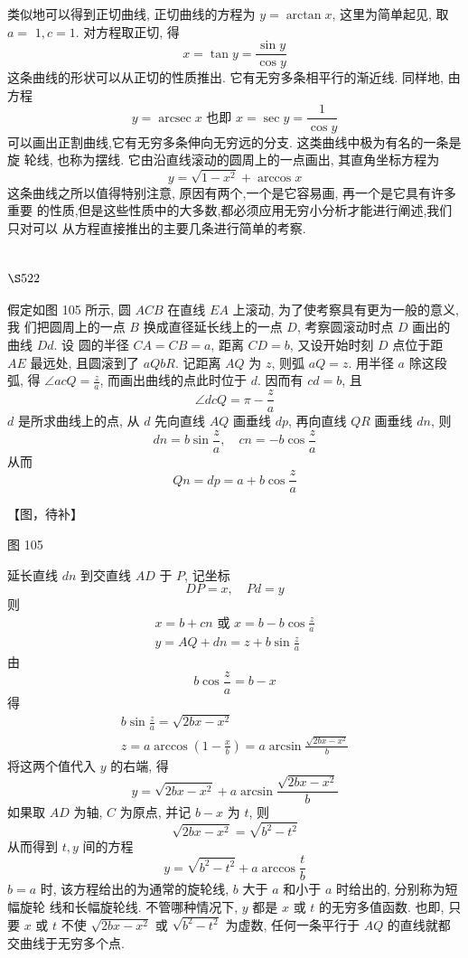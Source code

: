 类似地可以得到正切曲线, 正切曲线的方程为 $y=\arctan x$, 这里为简单起见, 取 $a=$ $1, c=1$. 对方程取正切, 得
\[
x=\tan y=\frac{\sin y}{\cos y}
\]
这条曲线的形状可以从正切的性质推出. 它有无穷多条相平行的渐近线. 同样地, 由方程
\[
y=\operatorname{arcsec} x \text { 也即 } x=\sec y=\frac{1}{\cos y}
\]
可以画出正割曲线,它有无穷多条伸向无穷远的分支. 这类曲线中极为有名的一条是旋 轮线, 也称为摆线. 它由沿直线滚动的圆周上的一点画出, 其直角坐标方程为
\[
y=\sqrt{1-x^{2}}+\arccos x
\]
这条曲线之所以值得特别注意, 原因有两个,一个是它容易画, 再一个是它具有许多重要 的性质,但是这些性质中的大多数,都必须应用无穷小分析才能进行阐述,我们只对可以 从方程直接推出的主要几条进行简单的考察.

\section{$\S 522$}

假定如图 105 所示, 圆 $A C B$ 在直线 $E A$ 上滚动, 为了使考察具有更为一般的意义, 我 们把圆周上的一点 $B$ 换成直径延长线上的一点 $D$, 考察圆滚动时点 $D$ 画出的曲线 $D d$. 设 圆的半径 $C A=C B=a$, 距离 $C D=b$, 又设开始时刻 $D$ 点位于距 $A E$ 最远处, 且圆滚到了 $a Q b R$. 记距离 $A Q$ 为 $z$, 则弧 $a Q=z$. 用半径 $a$ 除这段弧, 得 $\angle a c Q=\frac{z}{a}$, 而画出曲线的点此时位于 $d$. 因而有 $c d=b$, 且
\[
\angle d c Q=\pi-\frac{z}{a}
\]
$d$ 是所求曲线上的点, 从 $d$ 先向直线 $A Q$ 画垂线 $d p$, 再向直线 $Q R$ 画垂线 $d n$, 则
\[
d n=b \sin \frac{z}{a}, \quad c n=-b \cos \frac{z}{a}
\]
从而
\[
Q n=d p=a+b \cos \frac{z}{a}
\]

【图，待补】

图 105

延长直线 $d n$ 到交直线 $A D$ 于 $P$, 记坐标
\[
D P=x, \quad P d=y
\]
则
\[
\begin{gathered}
x=b+c n \text { 或 } x=b-b \cos \frac{z}{a} \\
y=A Q+d n=z+b \sin \frac{z}{a}
\end{gathered}
\]
由
\[
b \cos \frac{z}{a}=b-x
\]
得
\[
\begin{gathered}
b \sin \frac{z}{a}=\sqrt{2 b x-x^{2}} \\
z=a \arccos \left(1-\frac{x}{b}\right)=a \arcsin \frac{\sqrt{2 b x-x^{2}}}{b}
\end{gathered}
\]
将这两个值代入 $y$ 的右端, 得
\[
y=\sqrt{2 b x-x^{2}}+a \arcsin \frac{\sqrt{2 b x-x^{2}}}{b}
\]
如果取 $A D$ 为轴, $C$ 为原点, 并记 $b-x$ 为 $t$, 则
\[
\sqrt{2 b x-x^{2}}=\sqrt{b^{2}-t^{2}}
\]
从而得到 $t, y$ 间的方程
\[
y=\sqrt{b^{2}-t^{2}}+a \arccos \frac{t}{b}
\]
$b=a$ 时, 该方程给出的为通常的旋轮线, $b$ 大于 $a$ 和小于 $a$ 时给出的, 分别称为短幅旋轮 线和长幅旋轮线. 不管哪种情况下, $y$ 都是 $x$ 或 $t$ 的无穷多值函数. 也即, 只要 $x$ 或 $t$ 不使 $\sqrt{2 b x-x^{2}}$ 或 $\sqrt{b^{2}-t^{2}}$ 为虚数, 任何一条平行于 $A Q$ 的直线就都交曲线于无穷多个点.

